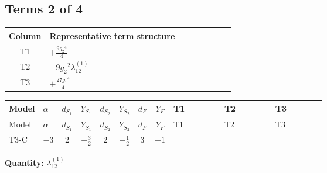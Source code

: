 \documentclass[8pt]{article}
\begin{document}
\begin{landscape}
\subsection*{Terms 2 of 4}
\begin{center}
\begin{tabular}{@{}c >{\raggedright\arraybackslash}p{0.82\linewidth}@{}}
\toprule
Column & Representative term structure \\
\midrule
T1 & \(\displaystyle +\frac{9 {g_2}^4}{4}\) \\
\midrule
T2 & \(\displaystyle -9 {g_2}^2 {\lambda_{12}^{(1)}}\) \\
\midrule
T3 & \(\displaystyle +\frac{27 {g_1}^4}{4}\) \\
\midrule
\bottomrule
\end{tabular}
\end{center}
\smallskip
\tiny
\begin{longtable}{@{}llcccccc >{\raggedright\arraybackslash}p{0.21\linewidth} >{\raggedright\arraybackslash}p{0.21\linewidth} >{\raggedright\arraybackslash}p{0.21\linewidth}@{}}
\toprule
Model & $\alpha$ & $d_{S_1}$ & $Y_{S_1}$ & $d_{S_2}$ & $Y_{S_2}$ & $d_F$ & $Y_F$ & T1 & T2 & T3 \\
\midrule
\endfirsthead
\toprule
Model & $\alpha$ & $d_{S_1}$ & $Y_{S_1}$ & $d_{S_2}$ & $Y_{S_2}$ & $d_F$ & $Y_F$ & T1 & T2 & T3 \\
\midrule
\endhead
T3-C & $-3$ & $2$ & $-\frac{3}{2}$ & $2$ & $-\frac{1}{2}$ & $3$ & $-1$ & \scriptsize\adjustbox{max width=\linewidth}{$\begin{gathered} +\frac{9 {g_2}^4}{4}\end{gathered}$} & \scriptsize\adjustbox{max width=\linewidth}{$\begin{gathered} -9 {g_2}^2 {\lambda_{12}^{(1)}}\end{gathered}$} & \scriptsize\adjustbox{max width=\linewidth}{$\begin{gathered} +\frac{27 {g_1}^4}{4}\end{gathered}$} \\
\midrule
\bottomrule
\end{longtable}
\clearpage
\noindent\textbf{Quantity: }$\lambda_{12}^{(1)}$\par\smallskip

\end{landscape}
\end{document}
